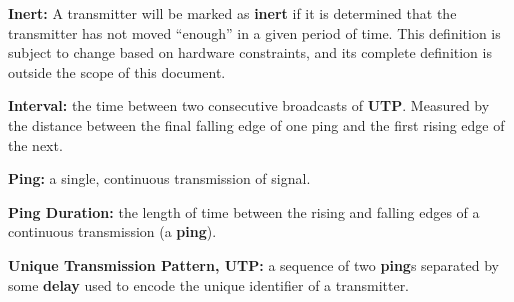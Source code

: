 \documentclass[12pt]{article}
\begin{document}
{\bf Inert:}
	A transmitter will be marked as {\bf inert} if it is determined that the
	transmitter has not moved ``enough'' in a given period of time.
	This definition is subject to change based on hardware constraints,
	and its complete definition is outside the scope of this document.

{\bf Interval:}
	the time between two consecutive broadcasts of {\bf UTP}. Measured by the
	distance between the final falling edge of one ping and the first rising
	edge of the next.

{\bf Ping:}
	a single, continuous transmission of signal.

{\bf Ping Duration:}
	the length of time between the rising and falling edges of a continuous
	transmission (a {\bf ping}).

{\bf Unique Transmission Pattern, UTP:}
	a sequence of two {\bf ping}s separated by some {\bf delay} used to
	encode the unique identifier of a transmitter.
\end{document}
